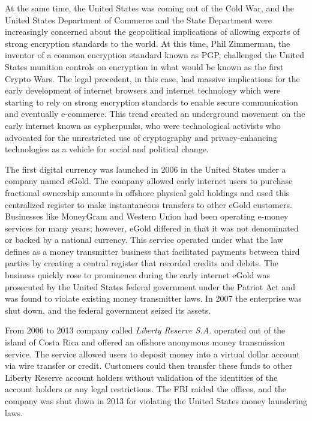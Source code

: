 At the same time, the United States was coming out of the Cold War, and the
United States Department of Commerce and the State Department were increasingly
concerned about the geopolitical implications of allowing exports of strong
encryption standards to the world. At this time, Phil Zimmerman, the inventor of
a common encryption standard known as PGP, challenged the United States munition
controls on encryption in what would be known as the first Crypto Wars. The
legal precedent, in this case, had massive implications for the early
development of internet browsers and internet technology which were starting to
rely on strong encryption standards to enable secure communication and
eventually e-commerce. This trend created an underground movement on the early
internet known as cypherpunks, who were technological activists who advocated
for the unrestricted use of cryptography and privacy-enhancing technologies as a
vehicle for social and political change.


The first digital currency was launched in 2006 in the United States under a
company named eGold. The company allowed early internet users to purchase
fractional ownership amounts in offshore physical gold holdings and used this
centralized register to make instantaneous transfers to other eGold customers.
Businesses like MoneyGram and Western Union had been operating e-money services
for many years; however, eGold differed in that it was not denominated or backed
by a national currency. This service operated under what the law defines as a
money transmitter business that facilitated payments between third parties by
creating a central register that recorded credits and debits. The business
quickly rose to prominence during the early internet eGold was prosecuted by the
United States federal government under the Patriot Act and was found to violate
existing money transmitter laws. In 2007 the enterprise was shut down, and the
federal government seized its assets. \cite{popper_untold_2015}


From 2006 to 2013 company called \textit{Liberty Reserve S.A.} operated out of
the island of Costa Rica and offered an offshore anonymous money transmission
service. The service allowed users to deposit money into a virtual dollar
account via wire transfer or credit. Customers could then transfer these funds
to other Liberty Reserve account holders without validation of the identities of
the account holders or any legal restrictions. The FBI raided the offices, and
the company was shut down in 2013 for violating the United States money
laundering laws.

